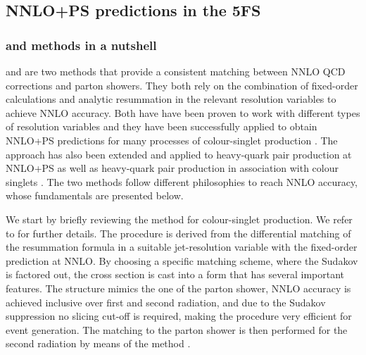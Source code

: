 \documentclass[11pt,a4paper]{article}
\begin{document}
\subsection{NNLO+PS predictions in the 5FS}\label{sec:5FSNNLOPS}
\subsubsection{\minnlo{} and \GENEVA{}  methods in a nutshell}\label{sec:nutshell}

\minnlo{} \cite{Monni:2019whf,Monni:2020nks} and \GENEVA{} \cite{Alioli:2012fc,Alioli:2013hqa} are two methods that provide a consistent matching
between NNLO QCD corrections and parton showers. They both rely on the
combination of fixed-order calculations and analytic resummation
in the relevant resolution variables to achieve NNLO accuracy.
Both have have been proven to work with different types of resolution variables \cite{alioli:2021qbf,Gavardi:2023aco,Ebert:2024zdj,Gavardi:2025zpf}
and they have been successfully applied to obtain NNLO+PS predictions for many processes of colour-singlet production \cite{Lombardi:2020wju,Lombardi:2021rvg,Buonocore:2021fnj,Lombardi:2021wug,Zanoli:2021iyp,Gavardi:2022ixt,Haisch:2022nwz,Lindert:2022qdd,Niggetiedt:2024nmp,Biello:2024vdh,Alioli:2015toa,Alioli:2019qzz,Alioli:2020qrd,alioli:2021qbf,Alioli:2021egp,Alioli:2022dkj,Alioli:2023har,Gavardi:2023aco,Gavardi:2025zpf,Alioli:2025xcu}.
The \minnlo{} approach has also been extended and applied to heavy-quark pair production at NNLO+PS \cite{mazzitelli:2020jio,mazzitelli:2021mmm,Mazzitelli:2023znt}
as well as heavy-quark pair production in association with colour singlets \cite{mazzitelli:2024ura,Biello:2024pgo}.
The two methods follow different philosophies to reach NNLO accuracy, whose
fundamentals are presented below.

We start by briefly reviewing the \minnlo{} method for colour-singlet production. We refer to  
for further details. The \minnlo{} procedure is derived from the differential matching of the resummation 
formula in a suitable jet-resolution variable with the fixed-order prediction at NNLO.
By choosing a specific matching scheme, where the Sudakov is factored out, the 
cross section is cast into a form that has several important features. The structure
mimics the one of the parton shower, NNLO accuracy is achieved inclusive over
first and second radiation, and due to the Sudakov suppression no slicing cut-off
is required, making the procedure very efficient for event generation.
The matching to the parton shower is then performed for the second radiation
by means of the \POWHEG{} method \cite{frixione:2007vw}.
\end{document}
